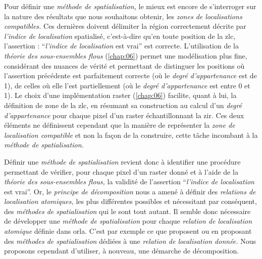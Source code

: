 Pour définir une \emph{méthode de spatialisation,} le mieux est encore
de s’interroger sur la nature des résultats que nous souhaitons
obtenir, les \emph{zones de localisations compatibles.} Ces dernières
doivent délimiter la région correctement décrite par \emph{l'indice de
  localisation} spatialisé, c'est-à-dire qu'en toute position de la
\ac{zlc}, l'assertion : \enquote{\emph{l'indice de localisation} est
  vrai} est correcte. L'utilisation de la \emph{théorie des
  sous-ensembles flous} (\autoref{chap:06}) permet une modélisation
plus fine, considérant des nuances de vérité et permettant de
distinguer les positions où l'assertion précédente est parfaitement
correcte (\ie où le \emph{degré d'appartenance} est de 1), de celles
où elle l'est partiellement (\ie où le \emph{degré d'appartenance} est
entre 0 et 1). Le choix d'une implémentation raster
(\autoref{chap:06}) facilite, quant à lui, la définition de zone de la
\ac{zlc}, en résumant sa construction au calcul d'un \emph{degré
  d'appartenance} pour chaque pixel d'un raster échantillonnant la
\ac{zir}. Ces deux éléments ne définissent cependant que la manière de
représenter la \emph{zone de localisation compatible} et non la façon
de la construire, cette tâche incombant à la \emph{méthode de
  spatialisation.}

Définir une \emph{méthode de spatialisation} revient donc à identifier
une procédure permettant de vérifier, pour chaque pixel d'un raster
donné et à l'aide de la \emph{théorie des sous-ensembles flous,} la
validité de l'assertion \enquote{\emph{l'indice de localisation} est
  vrai}. Or, le \emph{principe de décomposition} nous a amené à
définir des \emph{relations de localisation atomiques,} les plus
différentes possibles et nécessitant par conséquent, des
\emph{méthodes de spatialisation} qui le sont tout autant. Il semble
donc nécessaire de développer une \emph{méthode de spatialisation}
pour chaque \emph{relation de localisation atomique} définie dans
\ac{orla}. C'est par exemple ce que proposent \textcite{Vanegas2011}
ou \textcite{Takemura2012} en proposant des \emph{méthodes de
  spatialisation} dédiées à une \emph{relation de localisation
  donnée.} Nous proposons cependant d'utiliser, à nouveau, une
démarche de décomposition.

